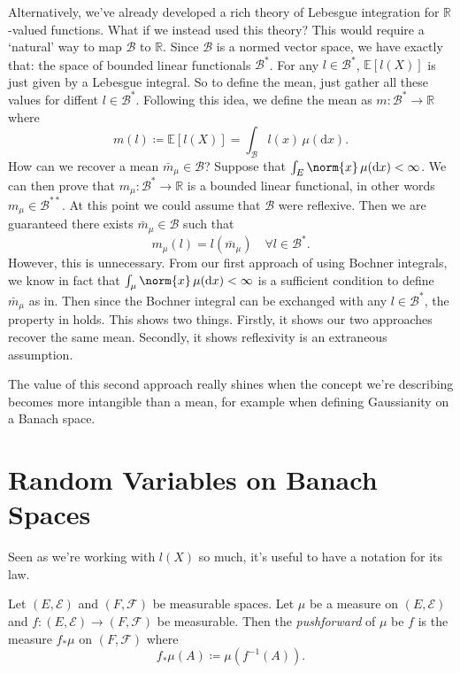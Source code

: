 \documentclass[fontsize=12pt, DIV=10]{scrreprt}
\theoremstyle{remark}
\newcommand{\defeq}{\coloneqq}
\newcommand{\R}{\mathbb R}
\newcommand{\E}{\mathbb E}
\newcommand{\calB}{\mathcal B}
\newcommand{\calE}{\mathcal E}
\newcommand{\calF}{\mathcal F}
\newcommand{\dif}[1]{\text{d} #1}
\begin{document}
Alternatively, we've already developed a rich theory of Lebesgue integration for $\R$-valued functions. What if we instead used this theory? This would require a `natural' way to map $\calB$ to $\R$. Since $\calB$ is a normed vector space, we have exactly that: the space of bounded linear functionals $\calB^*$. For any $l \in \calB^*$, $\E[l(X)]$ is just given by a Lebesgue integral. So to define the mean, just gather all these values for diffent $l \in \calB^*$. Following this idea, we define the mean as $m: \calB^* \to \R$ where
\begin{equation}
	m(l) \defeq \E[l(X)] = \int_{\calB} l(x) \, \mu(\dif x).
\end{equation}
How can we recover a mean $\bar{m}_{\mu} \in \calB$? Suppose that $\int_E \norm{x} \, \mu(\dif x) < \infty$. We can then prove that $m_{\mu}: \calB^* \to \R$ is a bounded linear functional, in other words $m_{\mu} \in \calB^{**}$. At this point we could assume that $\calB$ were reflexive. Then we are guaranteed there exists $\bar{m}_{\mu} \in \calB$ such that
\begin{equation}
	m_{\mu}(l) = l(\bar{m}_{\mu}) \quad \forall l \in \calB^*.
\end{equation}
However, this is unnecessary. From our first approach of using Bochner integrals, we know in fact that $\int_{\mu} \norm{x} \, \mu(\dif x) < \infty$ is a sufficient condition to define $\bar{m}_{\mu}$ as in. Then since the Bochner integral can be exchanged with any $l \in \calB^*$, the property in holds. This shows two things. Firstly, it shows our two approaches recover the same mean. Secondly, it shows reflexivity is an extraneous assumption.

The value of this second approach really shines when the concept we're describing becomes more intangible than a mean, for example when defining Gaussianity on a Banach space.

\section{Random Variables on Banach Spaces}


Seen as we're working with $l(X)$ so much, it's useful to have a notation for its law.
\begin{defn}
	Let $(E, \calE)$ and $(F, \calF)$ be measurable spaces. Let $\mu$ be a measure on $(E, \calE)$ and $f: (E, \calE) \to (F, \calF)$ be measurable. Then the \emph{pushforward} of $\mu$ be $f$ is the measure $f_* \mu$ on $(F, \calF)$ where
	\begin{equation}
		f_* \mu(A) \defeq \mu(f^{-1}(A)).
	\end{equation}
\end{defn}
\end{document}
